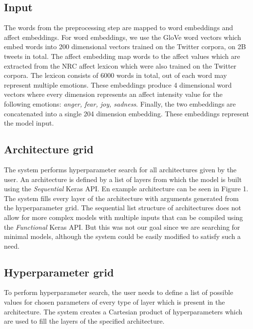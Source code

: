 \documentclass[10pt, a4paper]{article}
\begin{document}
\subsection{Input}
The words from the preprocessing step are mapped to word embeddings
and affect embeddings.
For word embeddings, we use the GloVe word vectors \citep{glove} 
which embed words into 200 dimensional vectors trained on the Twitter corpora,
on 2B tweets in total.
The affect embedding map words to the affect values which are
extracted from the NRC affect lexicon \citep{mohammed-semeval}
which were also trained on the Twitter corpora. The lexicon consists of 6000 words in total, out of each word may represent multiple emotions.
These embeddings produce 4 dimensional word vectors where every
dimension represents an affect intensity value for the following emotions: \textit{anger, fear, joy, sadness}.
Finally, the two embeddings are concatenated into a single 204 dimension embedding.
These embeddings represent the model input.

\subsection{Architecture grid}
The system performs hyperparameter search for all architectures
given by the user. 
An architecture is defined by a list of layers from which
the model is built using the \textit{Sequential} Keras API.
En example architecture can be seen in Figure 1.
The system fills every layer of the architecture with
arguments generated from the hyperparameter grid.
The sequential list structure of architectures does not
allow for more complex models with multiple inputs that can be
compiled using the \textit{Functional} Keras API.
But this was not our goal since we are searching for minimal models, 
although the system could be easily modified to satisfy such a need.

\subsection{Hyperparameter grid}
To perform hyperparameter search, the user needs to define
a list of possible values for chosen parameters of every type
of layer which is present in the architecture.
The system creates a Cartesian product of hyperparameters
which are used to fill the layers of the specified architecture.
\end{document}
